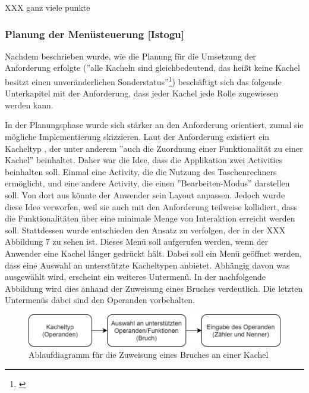 XXX ganz viele punkte

\clearpage

\subsubsection{Planung der Menüsteuerung [Istogu]}

Nachdem beschrieben wurde, wie die Planung für die Umsetzung der Anforderung erfolgte (''alle Kacheln sind gleichbedeutend, das heißt keine Kachel besitzt einen unveränderlichen Sonderstatus''\footnote{\cite[vgl.][]{seifert2020a}}) beschäftigt sich das folgende Unterkapitel mit der Anforderung, dass jeder Kachel jede Rolle zugewiesen werden kann.

In der Planungsphase wurde sich stärker an den Anforderung orientiert, zumal sie mögliche Implementierung skizzieren. Laut der Anforderung existiert ein Kacheltyp , der unter anderem ''auch die Zuordnung einer Funktionalität zu einer Kachel'' beinhaltet. Daher war die Idee, dass die Applikation zwei Activities beinhalten soll. Einmal eine Activity, die die Nutzung des Taschenrechners ermöglicht, und eine andere Activity, die einen ''Bearbeiten-Modus'' darstellen soll. Von dort aus könnte der Anwender sein Layout anpassen. Jedoch wurde diese Idee verworfen, weil sie auch mit den Anforderung teilweise kollidiert, dass die Funktionalitäten über eine minimale Menge von Interaktion erreicht werden soll. Stattdessen wurde entschieden den Ansatz zu verfolgen, der in der XXX Abbildung 7 zu sehen ist. Dieses Menü soll aufgerufen werden, wenn der Anwender eine Kachel länger gedrückt hält. 
Dabei soll ein Menü geöffnet werden, dass eine Auswahl an unterstützte Kacheltypen anbietet. Abhängig davon was ausgewählt wird, erscheint ein weiteres Untermenü. In der nachfolgende Abbildung wird dies anhand der Zuweisung eines Bruches verdeutlich. Die letzten Untermenüs dabei sind den Operanden vorbehalten.
 

\begin{figure}[!h]
	\includegraphics[width=1\columnwidth]{img/ablaufdiagramm-fuer-zuweisung}
	\caption[Ablaufdiagramm für die Zuweisung eines Bruches an einer Kachel]{Ablaufdiagramm für die Zuweisung eines Bruches an einer Kachel\footnotemark}
\end{figure}


